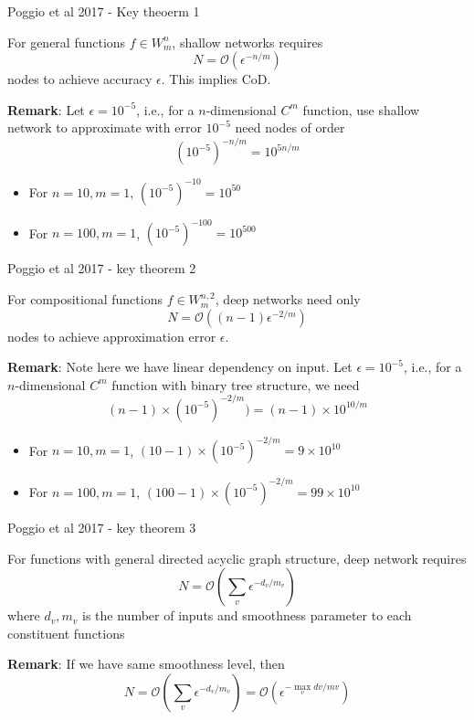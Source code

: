 \documentclass[aspectratio=169]{beamer} %
\begin{document}
\begin{frame}{Poggio et al 2017 - Key theoerm 1}
\begin{theorem}
    For general functions $f\in W_m^n$, shallow networks requires
    $$
    N = \mathcal{O}(\epsilon ^{-n/m})
    $$
    nodes to achieve accuracy $\epsilon$. This implies CoD.
\end{theorem}
    \textbf{Remark}: Let $\epsilon = 10^{-5}$, i.e., for a $n$-dimensional $C^m$ function, use shallow network to approximate with error $10^{-5}$ need nodes of order 
    $$
    (10^{-5})^{-n/m} = 10^{5n/m}
    $$
    \begin{itemize}
        \item For $n=10, m=1$, $(10^{-5})^{-10} = 10^{50}$
        \item For $n=100, m=1$, $(10^{-5})^{-100} = 10^{500}$
    \end{itemize}
\end{frame}
\begin{frame}{Poggio et al 2017 - key theorem 2}
\begin{theorem}
For compositional functions $f\in W^{n,2}_m$, deep networks need only
$$
N = \mathcal{O}((n-1)\epsilon^{-2/m})
$$
nodes to achieve approximation error $\epsilon$. 
\end{theorem}
\textbf{Remark}: Note here we have linear dependency on input. Let $\epsilon = 10^{-5}$, i.e., for a $n$-dimensional $C^m$ function with binary tree structure, we need 
$$
(n-1)\times (10^{-5})^{-2/m}) = (n-1)\times 10^{10/m}
$$
\begin{itemize}
    \item For $n=10, m=1$, $(10-1)\times (10^{-5})^{-2/m} = 9\times 10^{10}$
    \item For $n=100, m=1$, $(100-1)\times (10^{-5})^{-2/m} = 99\times 10^{10}$
\end{itemize}
\end{frame}
\begin{frame}{Poggio et al 2017 - key theorem 3}
    \begin{theorem}
    For functions with general directed acyclic graph structure, deep network requires
    $$
    N = \mathcal{O}(\sum_{v} \epsilon^{-d_v/m_v})
    $$
    where $d_v, m_v$ is the number of inputs and smoothness parameter to each constituent functions
    \end{theorem}
    \textbf{Remark}: If we have same smoothness level, then
    $$
    N = \mathcal{O}(\sum_{v} \epsilon^{-d_v/m_v}) = \mathcal{O}(\epsilon^{-\max_v dv/mv})
    $$
\end{frame}
\end{document}
